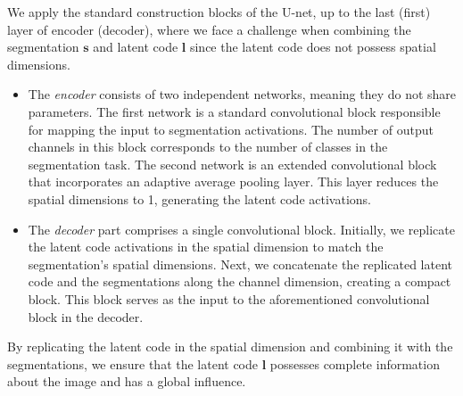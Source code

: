 We apply the standard construction blocks of the U-net, up to the last (first) layer of encoder (decoder), where we 
face a challenge when combining the segmentation $\mathbf{s}$ and latent code $\mathbf{l}$ since the latent code does
not possess spatial dimensions.
\begin{itemize}
    \item The \textit{encoder} consists of two independent networks, meaning they do not share parameters. 
    The first network is a standard convolutional block responsible for mapping the input to segmentation activations. 
    The number of output channels in this block corresponds to the number of classes in the segmentation task. 
    The second network is an extended convolutional block that incorporates an adaptive average pooling layer. 
    This layer reduces the spatial dimensions to 1, generating the latent code activations.

    \item The \textit{decoder} part comprises a single convolutional block. Initially, we replicate the latent
    code activations in the spatial dimension to match the segmentation's spatial dimensions. Next, we concatenate
    the replicated latent code and the segmentations along the channel dimension, creating a compact block. This
    block serves as the input to the aforementioned convolutional block in the decoder.
\end{itemize}
By replicating the latent code in the spatial dimension and combining it with the segmentations, we ensure that the
latent code $\mathbf{l}$ possesses complete information about the image and has a global influence. 

